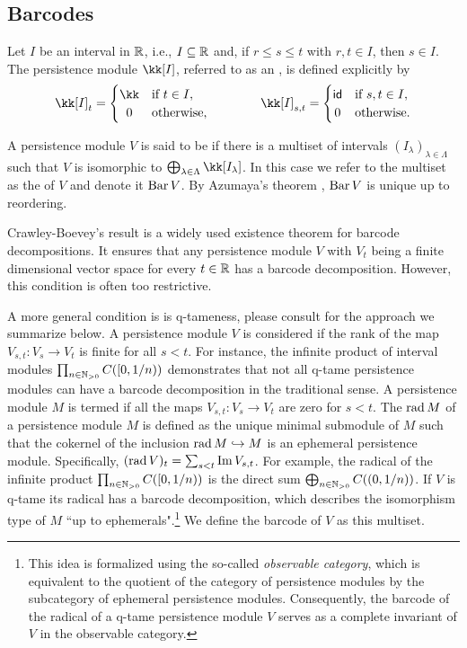\subsection{Barcodes}

Let $I$ be an interval in $\mathbb{R}$, i.e., $I \subseteq \mathbb{R}$ and, if $r \leq s \leq t$ with $r, t \in I$, then $s \in I$.
The persistence module $\kk[I]$, referred to as an , is defined explicitly by
\[
\kk[I]_t =
\begin{cases}
	\kk & \text{if } t \in I, \\
	\hfil 0 & \text{otherwise},
\end{cases}
\qquad \qquad
\kk[I]_{s, t} =
\begin{cases}
	\id & \text{if } s, t \in I, \\
	\hfil 0 & \text{otherwise}.
\end{cases}
\]

A persistence module $V$ is said to be  if there is a multiset of intervals $(I_\lambda)_{\lambda \in \Lambda}$ such that $V$ is isomorphic to $\bigoplus_{\lambda \in \Lambda} \kk[I_\lambda]$.
In this case we refer to the multiset as the  of $V$ and denote it $\operatorname{Bar} V$.
By Azumaya’s theorem \cite{azumaya1950theorem}, $\operatorname{Bar} V$ is unique up to reordering.

Crawley-Boevey's result \cite{Crawley-Boevey.2015} is a widely used existence theorem for barcode decompositions.
It ensures that any persistence module \(V\) with \(V_t\) being a finite dimensional vector space for every \(t \in \mathbb{R}\) has a barcode decomposition.
However, this condition is often too restrictive.

A more general condition is is q-tameness, please consult \cite{Chazal.2016a, Chazal.2016b} for the approach we summarize below.
A persistence module \(V\) is considered  if the rank of the map \(V_{s,t} \colon V_s \to V_t\) is finite for all \(s < t\).
For instance, the infinite product of interval modules \(\prod_{n \in \mathbb{N}_{> 0}} C([0,1/n))\) demonstrates that not all q-tame persistence modules can have a barcode decomposition in the traditional sense.
A persistence module \(M\) is termed  if all the maps \(V_{s,t} \colon V_s \to V_t\) are zero for \(s < t\).
The  \(\operatorname{rad} M\) of a persistence module \(M\) is defined as the unique minimal submodule of \(M\) such that the cokernel of the inclusion \(\operatorname{rad} M \hookrightarrow M\) is an ephemeral persistence module.
Specifically, \((\operatorname{rad} V)_t = \sum_{s<t} \operatorname{Im} V_{s,t}\).
For example, the radical of the infinite product \(\prod_{n \in \mathbb{N}_{> 0}} C([0, 1/n))\) is the direct sum \(\bigoplus_{n \in \mathbb{N}_{> 0}} C((0,1/n))\).
If \(V\) is q-tame its radical has a barcode decomposition, which describes the isomorphism type of \(M\) ``up to ephemerals".\footnote{
This idea is formalized using the so-called \textit{observable category}, which is equivalent to the quotient of the category of persistence modules by the subcategory of ephemeral persistence modules.
Consequently, the barcode of the radical of a q-tame persistence module \(V\) serves as a complete invariant of \(V\) in the observable category.}
We define the barcode of $V$ as this multiset.

